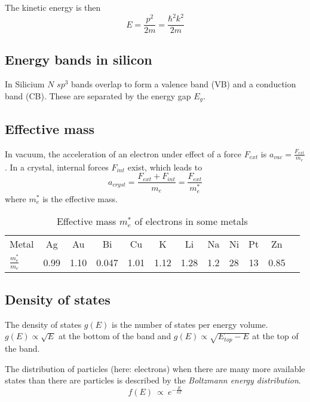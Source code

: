 The kinetic energy is then
\begin{equation}
    E = \frac{p^2}{2m} = \frac{\hbar^2 k^2}{2m}
\end{equation}


\subsection{Energy bands in silicon}
In Silicium $N$ $sp^3$ bands overlap to form a valence band (VB) and a conduction band (CB).  
These are separated by the energy gap $E_g$.

\subsection{Effective mass}
In vacuum, the acceleration of an electron under effect of a force $F_{ext}$ is $a_{vac} = \frac{F_{ext}}{m_e}$. 
In a crystal, internal forces $F_{int}$ exist, which leads to
\begin{equation}
    a_{cryst} = \frac{F_{ext}+F_{int}}{m_e} = \frac{F_{ext}}{m_e^*}
\end{equation}
where $m_e^*$ is the effective mass.

\begin{table}[htbp]
    \centering
    \begin{tabular}{lccccccccccc}
    \toprule
    Metal & Ag & Au & Bi & Cu & K & Li & Na & Ni & Pt & Zn \\
    $\frac{m_e^*}{m_e}$ & 0.99 & 1.10 & 0.047 & 1.01 & 1.12 & 1.28 & 1.2 & 28 & 13 & 0.85 \\
    \bottomrule
    \end{tabular}
    \caption{Effective mass $m_e^*$ of electrons in some metals}
\end{table}

\subsection{Density of states}
The density of states $g(E)$ is the number of states per energy volume. 
$g(E) \propto \sqrt{E}$ at the bottom of the band and $g(E) \propto \sqrt{E_{top}-E}$ at the top of the band.

The distribution of particles (here: electrons) when there are many more available states than there are particles is described by the \emph{Boltzmann energy distribution}.
\begin{equation}
    f(E) \:\propto\: e^{-\frac{E}{kT}}
\end{equation} 

